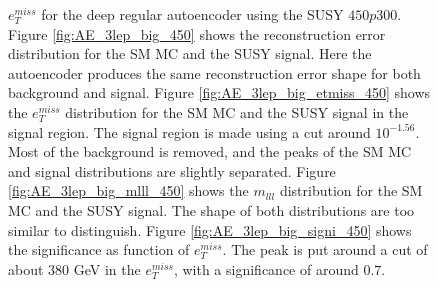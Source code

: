 \begin{figure}[h!]
{    $e_T^{miss}$ for the deep regular autoencoder using the SUSY $450p300$. Figure \ref{fig:AE_3lep_big_450} shows the reconstruction error 
    distribution for the SM MC and the SUSY signal. Here the autoencoder produces the same reconstruction error shape for both background and 
    signal. Figure \ref{fig:AE_3lep_big_etmiss_450} shows the $e_T^{miss}$ distribution for the SM MC and the SUSY signal in the signal region. 
    The signal region is made using a cut around $10^{-1.56}$. Most of the background is removed, and the peaks of the SM MC and signal 
    distributions are slightly separated. Figure \ref{fig:AE_3lep_big_mlll_450} shows the $m_{lll}$ distribution for the SM MC and the SUSY signal. 
    The shape of both distributions are too similar to distinguish. Figure \ref{fig:AE_3lep_big_signi_450} shows the significance as function of
    $e_T^{miss}$. The peak is put around a cut of about 380 GeV in the $e_T^{miss}$, with a significance of around $0.7$.}
    \label{fig:AE_3lep_big_rec_sig_signi_450}
\end{figure}

